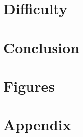 \documentclass[journal, twocolumn, final,11pt,letterpaper]{IEEEtran}
\begin{document}
\section{ Difficulty}


\section{Conclusion} 



\section{Figures}
\section*{Appendix}


%
%     
\end{document}

